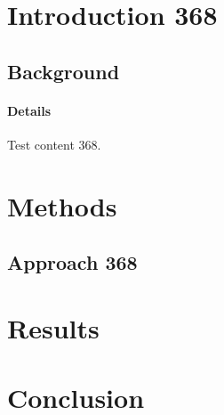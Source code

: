 \documentclass{article}
\begin{document}
\section{Introduction 368}
\subsection{Background}
\paragraph{Details} Test content 368.
\section{Methods}
\subsection{Approach 368}
\section{Results}
\section{Conclusion}
\end{document}
